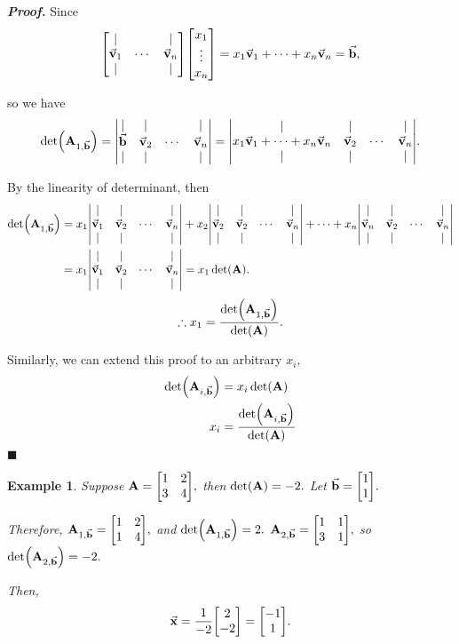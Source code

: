 \documentclass[12pt, a4paper]{article}
\newtheorem{eg}{Example}[subsection]
\newenvironment*{prf}{\par\indent\textbf{\textit{Proof. }}}{\hfill $\blacksquare$\par}
\def\vecx{\va{x}}
\def\vecv{\va{v}}
\def\vecb{\va{b}}
\def\matrixA{\vb{A}}
\begin{document}
\begin{prf}
	Since \[\mqty[|&&|\\\vecv_1&\cdots&\vecv_n\\|&&|]\mqty[x_1\\\vdots\\x_n]=x_1\vecv_1+\cdots+x_n\vecv_n=\vecb,\]\par so we have \[\det(\matrixA_{1,\vecb})=\mqty|{|&|&&|\\\vecb&\vecv_2&\cdots&\vecv_n\\|&|&&|}|=\mqty|{|&|&&|\\x_1\vecv_1+\cdots+x_n\vecv_n&\vecv_2&\cdots&\vecv_n\\|&|&&|}|.\]\par By the linearity of determinant, then \[\begin{aligned}\det(\matrixA_{1,\vecb})&=x_1\mqty|{|&|&&|\\\vecv_1&\vecv_2&\cdots&\vecv_n\\|&|&&|}|+x_2\mqty|{|&|&&|\\\vecv_2&\vecv_2&\cdots&\vecv_n\\|&|&&|}|+\cdots+x_n\mqty|{|&|&&|\\\vecv_n&\vecv_2&\cdots&\vecv_n\\|&|&&|}|\\&=x_1\mqty|{|&|&&|\\\vecv_1&\vecv_2&\cdots&\vecv_n\\|&|&&|}|=x_1\det(\matrixA).\end{aligned}\]\[\therefore x_1=\dfrac{\det(\matrixA_{1,\vecb})}{\det(\matrixA)}.\]\par Similarly, we can extend this proof to an arbitrary $x_i,$ \[\begin{aligned}\det(\matrixA_{i,\vecb})&=x_i\det(\matrixA)\\x_i&=\dfrac{\det(\matrixA_{i,\vecb})}{\det(\matrixA)}\end{aligned}\]
\end{prf}
\begin{eg}
	Suppose $\matrixA=\mqty[1&2\\3&4],$ then $\det(\matrixA)=-2.$ Let $\vecb=\mqty[1\\1].$\par Therefore, $\matrixA_{1,\vecb}=\mqty[1&2\\1&4],$ and $\det(\matrixA_{1,\vecb})=2.$ $\matrixA_{2,\vecb}=\mqty[1&1\\3&1],$ so $\det(\matrixA_{2,\vecb})=-2.$\par Then, \[\vecx=\dfrac{1}{-2}\mqty[2\\-2]=\mqty[-1\\1].\]
\end{eg}
\end{document}
